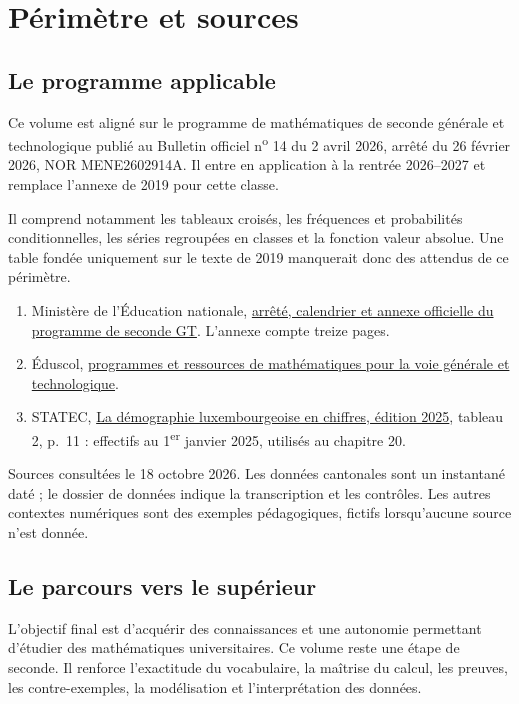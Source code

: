 \documentclass[11pt,a4paper,oneside]{book}
\begin{document}
\frontmatter\tableofcontents\mainmatter
\chapter{Périmètre et sources}
\section{Le programme applicable}
Ce volume est aligné sur le programme de mathématiques de seconde générale et technologique publié au Bulletin officiel n\textsuperscript{o} 14 du 2 avril 2026, arrêté du 26 février 2026, NOR MENE2602914A. Il entre en application à la rentrée 2026--2027 et remplace l'annexe de 2019 pour cette classe.

Il comprend notamment les tableaux croisés, les fréquences et probabilités conditionnelles, les séries regroupées en classes et la fonction valeur absolue. Une table fondée uniquement sur le texte de 2019 manquerait donc des attendus de ce périmètre.
\begin{enumerate}
\item Ministère de l'Éducation nationale, \href{https://www.education.gouv.fr/bo/2026/Hebdo14/MENE2602914A}{arrêté, calendrier et annexe officielle du programme de seconde GT}. L'annexe compte treize pages.
\item Éduscol, \href{https://eduscol.education.gouv.fr/5817/programmes-et-ressources-en-mathematiques-voie-gt}{programmes et ressources de mathématiques pour la voie générale et technologique}.
\item STATEC, \href{https://statistiques.public.lu/dam-assets/catalogue-publications/en-chiffres/2025/population-chiffres-2025.pdf}{La démographie luxembourgeoise en chiffres, édition 2025}, tableau 2, p.~11 : effectifs au 1\textsuperscript{er} janvier 2025, utilisés au chapitre 20.
\end{enumerate}
Sources consultées le 18 octobre 2026. Les données cantonales sont un instantané daté ; le dossier de données indique la transcription et les contrôles. Les autres contextes numériques sont des exemples pédagogiques, fictifs lorsqu'aucune source n'est donnée.
\section{Le parcours vers le supérieur}
L'objectif final est d'acquérir des connaissances et une autonomie permettant d'étudier des mathématiques universitaires. Ce volume reste une étape de seconde. Il renforce l'exactitude du vocabulaire, la maîtrise du calcul, les preuves, les contre-exemples, la modélisation et l'interprétation des données.
\end{document}
